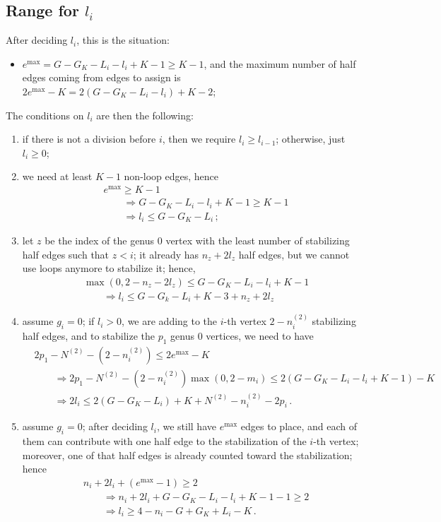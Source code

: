 \documentclass{amsart}
\theoremstyle{plain}
\theoremstyle{definition}
\DeclareMathOperator{\MAX}{max}
\begin{document}
\subsection{Range for $l_i$}

After deciding $l_i$, this is the situation:
\begin{itemize}
\item $e^{\MAX} = G - G_K - L_i - l_i + K - 1 \geq K-1$, and the
  maximum number of half edges coming from edges to assign is
  $2e^{\MAX} - K = 2(G - G_K - L_i - l_i) + K - 2$;
\end{itemize}

The conditions on $l_i$ are then the following:
\begin{enumerate}
\item if there is not a division before $i$, then we require $l_i \geq
  l_{i-1}$; otherwise, just $l_i \geq 0$;
\item we need at least $K-1$ non-loop edges, hence
  \begin{align*}
    &e^{\MAX} \geq K-1\\
    &\qquad\Rightarrow G - G_K - L_i - l_i + K-1 \geq K-1\\
    &\qquad\Rightarrow l_i \leq G - G_K - L_i\,\text{;}
  \end{align*}
\item let $z$ be the index of the genus $0$ vertex with the least
  number of stabilizing half edges such that $z < i$; it already has
  $n_z + 2l_z$ half edges, but we cannot use loops anymore to
  stabilize it; hence,
  \begin{align*}
    &\max(0, 2-n_z-2l_z) \leq G - G_K - L_i - l_i + K - 1\\
    &\qquad\Rightarrow l_i \leq G - G_k - L_i + K - 3 + n_z + 2l_z
  \end{align*}
\item assume $g_i = 0$; if $l_i > 0$, we are adding to the $i$-th
  vertex $2-n^{(2)}_i$ stabilizing half edges, and to stabilize the
  $p_1$ genus $0$ vertices, we need to have
  \begin{align*}
    &2 p_1 - N^{(2)} - (2-n^{(2)}_i) \leq 2e^{\MAX} - K\\
    &\qquad\Rightarrow 2p_1 - N^{(2)} - (2-n^{(2)}_i) \max(0, 2-m_i) \leq 2(G - G_K - L_i - l_i + K - 1) - K\\
    &\qquad\Rightarrow 2l_i \leq 2(G - G_K - L_i) + K + N^{(2)} - n^{(2)}_i - 2p_i\,\text{.}
  \end{align*}
\item assume $g_i = 0$; after deciding $l_i$, we still have $e^{\MAX}$
  edges to place, and each of them can contribute with one half edge
  to the stabilization of the $i$-th vertex; moreover, one of that
  half edges is already counted toward the stabilization; hence
  \begin{align*}
    &n_i + 2l_i + (e^{\MAX} - 1) \geq 2\\
    &\qquad\Rightarrow n_i + 2l_i + G - G_K - L_i - l_i + K - 1 - 1 \geq 2\\
    &\qquad\Rightarrow l_i \geq 4 - n_i - G + G_K + L_i - K\,\text{.}
  \end{align*}
\end{enumerate}
\end{document}
